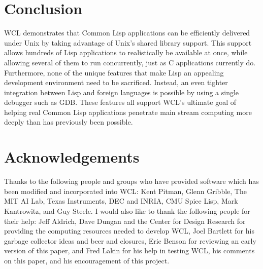\section{Conclusion}

WCL demonstrates that Common Lisp applications can be efficiently
delivered under Unix by taking advantage of Unix's shared library
support.  This support allows hundreds of Lisp applications to
realistically be available at once, while allowing several of them to
run concurrently, just as C applications currently do. Furthermore,
none of the unique features that make Lisp an appealing development
environment need to be sacrificed. Instead, an even tighter
integration between Lisp and foreign languages is possible by using a
single debugger such as GDB. These features all support WCL's ultimate
goal of helping real Common Lisp applications penetrate main
stream computing more deeply than has previously been possible.

\section{Acknowledgements}
Thanks to the following people and groups who have provided software
which has been modified and incorporated into WCL: Kent Pitman, Glenn
Gribble, The MIT AI Lab, Texas Instruments, DEC and INRIA, CMU Spice
Lisp, Mark Kantrowitz, and Guy Steele.  I would also like to thank the
following people for their help: Jeff Aldrich, Dave Dungan and the
Center for Design Research for providing the computing resources
needed to develop WCL, Joel Bartlett for his garbage collector ideas
and beer and closures, Eric Benson for reviewing an early version of
this paper, and Fred Lakin for his help in testing WCL, his comments on
this paper, and his encouragement of this project.

\begingroup
\def\thebibliography#1{\section*{References}\list
 {[\arabic{enumi}]}{\settowidth\labelwidth{[#1]}\leftmargin\labelwidth
 \advance\leftmargin\labelsep
 \usecounter{enumi}}
 \def\newblock{\hskip .11em plus .33em minus .07em}
 \itemsep=0pt\parsep=0pt
 \sloppy\clubpenalty4000\widowpenalty4000
 \sfcode`\.=1000\relax}
\let\endthebibliography=\endlist

\small \baselineskip=11pt

\endgroup




